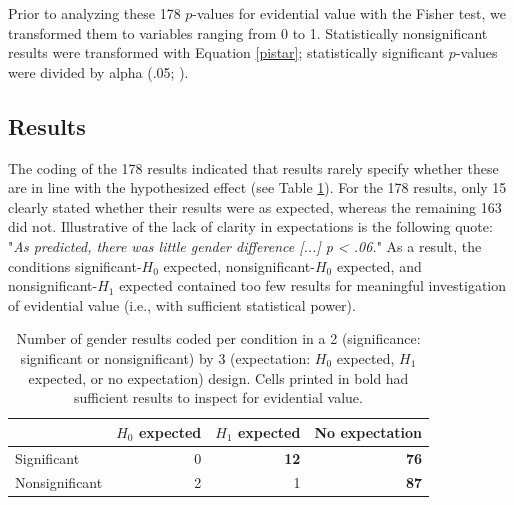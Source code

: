 \documentclass{article}
\begin{document}
Prior to analyzing these 178 $p$-values for evidential value with the Fisher test, we transformed them to variables ranging from 0 to 1. Statistically nonsignificant results were transformed with Equation \ref{pistar}; statistically significant $p$-values were divided by alpha (.05; \cite{Van_Assen2015-gg,Simonsohn2014-dm}).

\subsection*{Results}


The coding of the 178 results indicated that results rarely specify whether these are in line with the hypothesized effect (see Table \ref{tab:tab5}). For the 178 results, only 15 clearly stated whether their results were as expected, whereas the remaining 163 did not. Illustrative of the lack of clarity in expectations is the following quote: "\textit{As predicted, there was little gender difference [...] p < .06.}" As a result, the conditions significant-$H_0$ expected, nonsignificant-$H_0$ expected, and nonsignificant-$H_1$ expected contained too few results for meaningful investigation of evidential value (i.e., with sufficient statistical power).

\begin{table}[htbp]
\caption{Number of gender results coded per condition in a 2 (significance: significant or nonsignificant) by 3 (expectation: $H_0$ expected, $H_1$ expected, or no expectation) design. Cells printed in bold had sufficient results to inspect for evidential value.}
\centering
\begin{tabular}{lrrr}
& $H_0$ expected & $H_1$ expected & No expectation \\
\hline
Significant    & 0           & \textbf{12}          & \textbf{76}             \\
Nonsignificant & 2           & 1           & \textbf{87}     \\
\hline
\end{tabular}
\label{tab:tab5}
\end{table}
\end{document}
